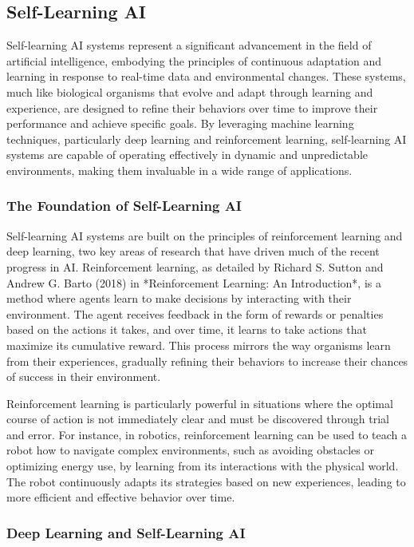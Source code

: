 \documentclass[12pt,twoside]{article}
\begin{document}
\subsection{Self-Learning AI}

Self-learning AI systems represent a significant advancement in the field of artificial intelligence, embodying the principles of continuous adaptation and learning in response to real-time data and environmental changes. These systems, much like biological organisms that evolve and adapt through learning and experience, are designed to refine their behaviors over time to improve their performance and achieve specific goals. By leveraging machine learning techniques, particularly deep learning and reinforcement learning, self-learning AI systems are capable of operating effectively in dynamic and unpredictable environments, making them invaluable in a wide range of applications.


\subsubsection{The Foundation of Self-Learning AI}

Self-learning AI systems are built on the principles of reinforcement learning and deep learning, two key areas of research that have driven much of the recent progress in AI. Reinforcement learning, as detailed by Richard S. Sutton and Andrew G. Barto (2018) in *Reinforcement Learning: An Introduction*, is a method where agents learn to make decisions by interacting with their environment. The agent receives feedback in the form of rewards or penalties based on the actions it takes, and over time, it learns to take actions that maximize its cumulative reward. This process mirrors the way organisms learn from their experiences, gradually refining their behaviors to increase their chances of success in their environment.

Reinforcement learning is particularly powerful in situations where the optimal course of action is not immediately clear and must be discovered through trial and error. For instance, in robotics, reinforcement learning can be used to teach a robot how to navigate complex environments, such as avoiding obstacles or optimizing energy use, by learning from its interactions with the physical world. The robot continuously adapts its strategies based on new experiences, leading to more efficient and effective behavior over time.

\subsubsection{Deep Learning and Self-Learning AI}
\end{document}
